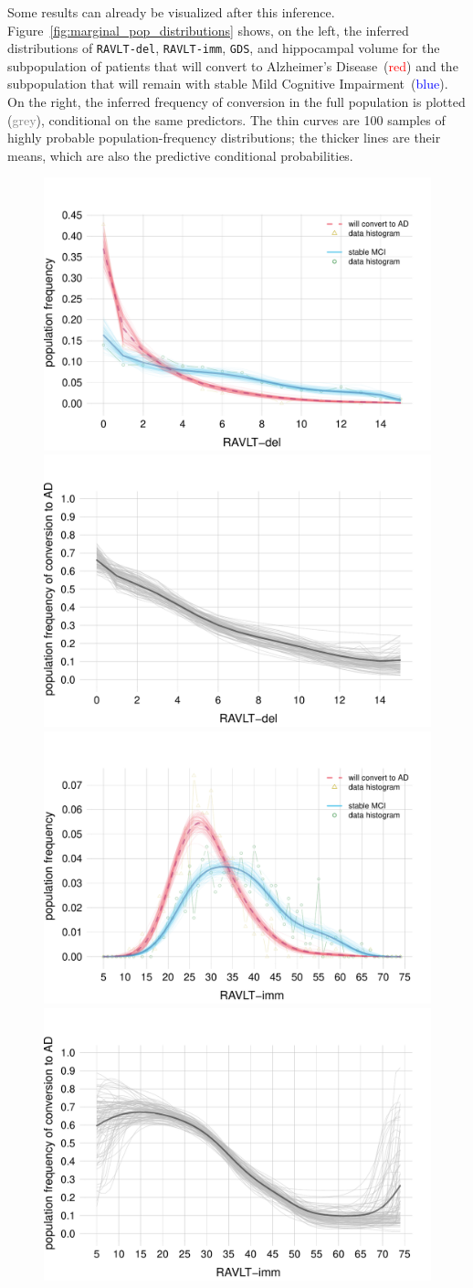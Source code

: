 \documentclass[utf8]{FrontiersinHarvard_mod} %
\renewcommand*{\|}[1][]{\nonscript\:#1\vert\nonscript\:\mathopen{}}
\newcommand*{\gds}{\texttt{GDS}}
\newcommand*{\ravltimm}{\texttt{RAVLT-imm}}
\newcommand*{\ravltdel}{\texttt{RAVLT-del}}
\newcommand*{\ad}{Alzheimer's Disease}
\newcommand*{\mci}{Mild Cognitive Impairment}
\begin{document}
Some results can already be visualized after this inference. Figure~\ref{fig:marginal_pop_distributions} shows, on the left, the inferred distributions of \ravltdel, \ravltimm, \gds, and hippocampal volume for the subpopulation of patients that will convert to \ad\ (\textcolor{red}{red}) and the subpopulation that will remain with stable \mci\ (\textcolor{blue}{blue}). On the right, the inferred frequency of conversion in the full population is plotted (\textcolor{grey}{grey}), conditional on the same predictors. The thin curves are 100 samples of highly probable population-frequency distributions; the thicker lines are their means, which are also the predictive conditional probabilities.
\begin{figure}[!t]
\centering%
\includegraphics[width=0.43\linewidth]{population_distr_scat_RAVLT-del.pdf}%
\qquad%
\includegraphics[width=0.43\linewidth]{prob_conversion_RAVLT-del.pdf}%
\\
\includegraphics[width=0.43\linewidth]{population_distr_scat_RAVLT-imm.pdf}%
\qquad%
\includegraphics[width=0.43\linewidth]{prob_conversion_RAVLT-imm.pdf}%

\end{figure}
\end{document}
